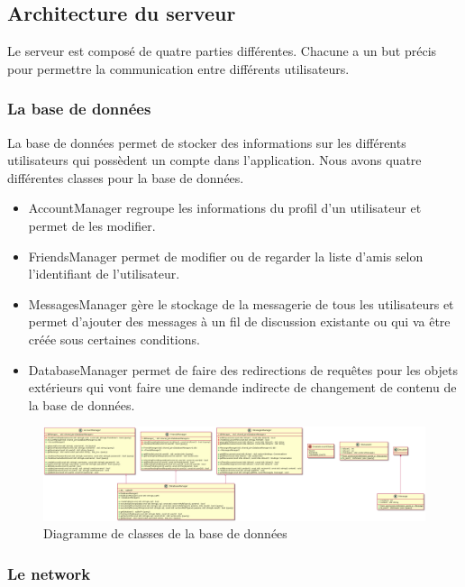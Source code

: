 \documentclass{article}
\begin{document}
\newpage


\subsection{Architecture du serveur}

Le serveur est composé de quatre parties différentes. Chacune a un but précis pour permettre la communication entre différents utilisateurs.

\subsubsection{La base de données}

La base de données permet de stocker des informations sur les différents utilisateurs qui possèdent un compte dans l'application. Nous avons quatre différentes classes pour la base de données. 
\begin{itemize}
	\item AccountManager regroupe les informations du profil d'un utilisateur et permet de les modifier.
	\item FriendsManager permet de modifier ou de regarder la liste d'amis selon l'identifiant de l'utilisateur.
	\item MessagesManager gère le stockage de la messagerie de tous les utilisateurs et permet d'ajouter des messages à un fil de discussion existante ou qui va être créée sous certaines conditions. 
	\item DatabaseManager permet de faire des redirections de requêtes pour les objets extérieurs qui vont faire une demande indirecte de changement de contenu de la base de données.
\end{itemize}

\begin{figure}[!ht]
	\centering
	 \includegraphics[scale=0.2]{../../res/uml/class/DatabaseClass.png}
	 \caption{Diagramme de classes de la base de données}
	 \label{fig:DatabaseDiagram}
\end{figure}

\subsubsection{Le network}
\end{document}
